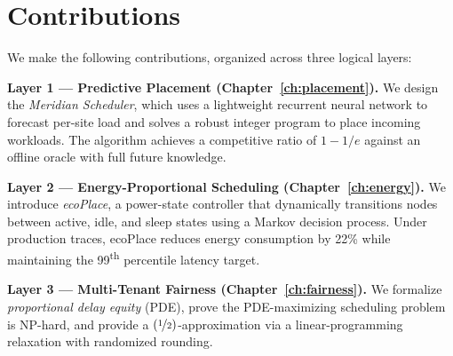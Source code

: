 \section{Contributions}

We make the following contributions, organized across three logical layers:

\begin{tcolorbox}[
  colback=uclablue!4,
  colframe=uclablue!40,
  boxrule=0.5pt,
  arc=3pt,
  left=10pt,
  right=10pt,
  top=8pt,
  bottom=8pt,
  breakable
]
\singlespacing
\small
\textbf{Layer 1 --- Predictive Placement (Chapter~\ref{ch:placement}).}
We design the \emph{Meridian Scheduler}, which uses a lightweight recurrent
neural network to forecast per-site load and solves a robust integer program
to place incoming workloads. The algorithm achieves a competitive ratio of
\(1 - 1/e\) against an offline oracle with full future knowledge.

\medskip
\textbf{Layer 2 --- Energy-Proportional Scheduling (Chapter~\ref{ch:energy}).}
We introduce \emph{ecoPlace}, a power-state controller that dynamically
transitions nodes between active, idle, and sleep states using a Markov
decision process. Under production traces, ecoPlace reduces energy consumption
by 22\% while maintaining the 99\textsuperscript{th} percentile latency target.

\medskip
\textbf{Layer 3 --- Multi-Tenant Fairness (Chapter~\ref{ch:fairness}).}
We formalize \emph{proportional delay equity} (PDE), prove the PDE-maximizing
scheduling problem is NP-hard, and provide a \((\nicefrac{1}{2})\)-approximation
via a linear-programming relaxation with randomized rounding.
\end{tcolorbox}
